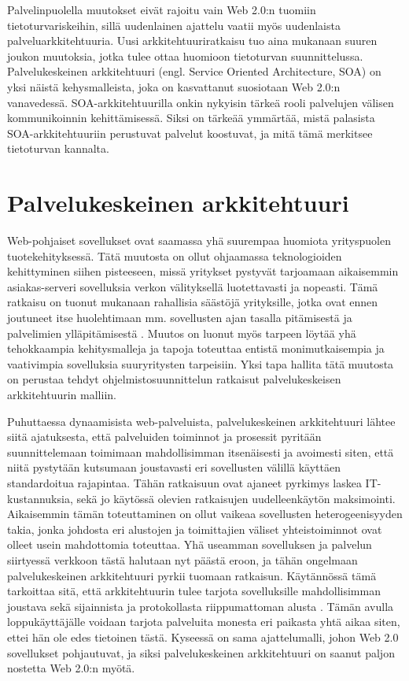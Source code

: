 Palvelinpuolella muutokset eivät rajoitu vain Web 2.0:n tuomiin
tietoturvariskeihin, sillä uudenlainen ajattelu vaatii myös uudenlaista
palveluarkkitehtuuria. Uusi arkkitehtuuriratkaisu tuo aina mukanaan suuren
joukon muutoksia, jotka tulee ottaa huomioon tietoturvan suunnittelussa.
Palvelukeskeinen arkkitehtuuri (engl. Service Oriented Architecture, SOA) on
yksi näistä kehysmalleista, joka on kasvattanut suosiotaan Web 2.0:n
vanavedessä. SOA-arkkitehtuurilla onkin nykyisin tärkeä rooli palvelujen
välisen kommunikoinnin kehittämisessä. Siksi on tärkeää ymmärtää, mistä
palasista SOA-arkkitehtuuriin perustuvat palvelut koostuvat, ja mitä tämä
merkitsee tietoturvan kannalta.

\section{Palvelukeskeinen arkkitehtuuri}

Web-pohjaiset sovellukset ovat saamassa yhä suurempaa huomiota yrityspuolen
tuotekehityksessä. Tätä muutosta on ollut ohjaamassa teknologioiden
kehittyminen siihen pisteeseen, missä yritykset pystyvät tarjoamaan aikaisemmin
asiakas-serveri sovelluksia verkon välityksellä luotettavasti ja nopeasti. Tämä
ratkaisu on tuonut mukanaan rahallisia säästöjä yrityksille, jotka ovat ennen
joutuneet itse huolehtimaan mm. sovellusten ajan tasalla pitämisestä ja
palvelimien ylläpitämisestä \cite{WEB2}. Muutos on luonut myös tarpeen löytää yhä
tehokkaampia kehitysmalleja ja tapoja toteuttaa entistä monimutkaisempia ja
vaativimpia sovelluksia suuryritysten tarpeisiin. Yksi tapa hallita tätä
muutosta on perustaa tehdyt ohjelmistosuunnittelun ratkaisut palvelukeskeisen
arkkitehtuurin malliin.

Puhuttaessa dynaamisista web-palveluista, palvelukeskeinen arkkitehtuuri lähtee siitä
ajatuksesta, että palveluiden toiminnot ja prosessit pyritään suunnittelemaan
toimimaan mahdollisimman itsenäisesti ja avoimesti siten, että niitä pystytään
kutsumaan joustavasti eri sovellusten välillä käyttäen standardoitua rajapintaa.
Tähän ratkaisuun ovat ajaneet pyrkimys laskea IT-kustannuksia, sekä jo käytössä olevien 
ratkaisujen uudelleenkäytön maksimointi. Aikaisemmin tämän toteuttaminen
on ollut vaikeaa sovellusten heterogeenisyyden takia, jonka johdosta eri
alustojen ja toimittajien väliset yhteistoiminnot ovat olleet usein mahdottomia
toteuttaa. Yhä useamman sovelluksen ja palvelun siirtyessä verkkoon tästä
halutaan nyt päästä eroon, ja tähän ongelmaan palvelukeskeinen arkkitehtuuri
pyrkii tuomaan ratkaisun. Käytännössä tämä tarkoittaa sitä, että arkkitehtuurin
tulee tarjota sovelluksille mahdollisimman joustava sekä sijainnista ja
protokollasta riippumattoman alusta \cite{SOA}. Tämän avulla loppukäyttäjälle
voidaan tarjota palveluita monesta eri paikasta yhtä aikaa siten, ettei hän ole
edes tietoinen tästä. Kyseessä on sama ajattelumalli, johon Web 2.0 sovellukset
pohjautuvat, ja siksi palvelukeskeinen arkkitehtuuri on saanut paljon
nostetta Web 2.0:n myötä.

